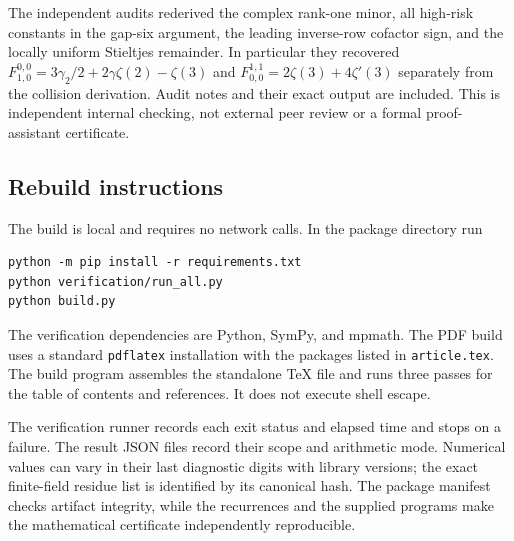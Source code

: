 The independent audits rederived the complex rank-one minor,
all high-risk constants in the gap-six argument, the leading
inverse-row cofactor sign, and the locally uniform Stieltjes
remainder. In particular they recovered
$F_{1,0}^{0,0}=3\gamma_2/2+2\gamma\zeta(2)-\zeta(3)$ and
$F_{0,0}^{1,1}=2\zeta(3)+4\zeta'(3)$ separately from the
collision derivation. Audit notes and their exact output are
included. This is independent internal checking, not external
peer review or a formal proof-assistant certificate.

\subsection{Rebuild instructions}

The build is local and requires no network calls. In the package
directory run
\begin{verbatim}
python -m pip install -r requirements.txt
python verification/run_all.py
python build.py
\end{verbatim}
The verification dependencies are Python, SymPy, and mpmath.
The PDF build uses a standard \texttt{pdflatex} installation with
the packages listed in \texttt{article.tex}. The build program
assembles the standalone \TeX{} file and runs three passes for
the table of contents and references. It does not execute shell
escape.

The verification runner records each exit status and elapsed
time and stops on a failure. The result JSON files record their
scope and arithmetic mode. Numerical values can vary in their
last diagnostic digits with library versions; the exact
finite-field residue list is identified by its canonical hash.
The package manifest checks artifact integrity, while the
recurrences and the supplied programs make the mathematical
certificate independently reproducible.

